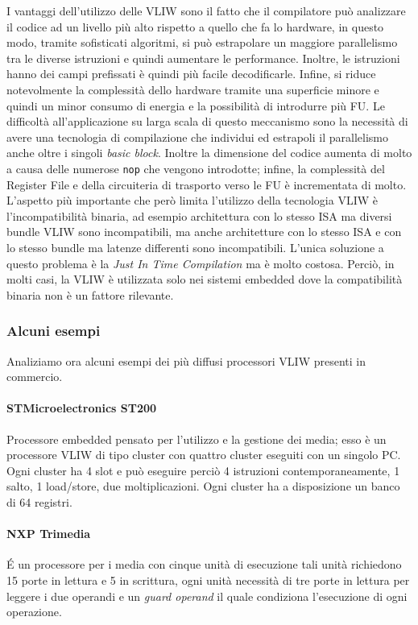 I vantaggi dell'utilizzo delle VLIW sono il fatto che il compilatore può analizzare il codice ad un livello più alto rispetto a quello che fa lo hardware, in questo modo, tramite sofisticati algoritmi, si può estrapolare un maggiore parallelismo tra le diverse istruzioni e quindi aumentare le performance. Inoltre, le istruzioni hanno dei campi prefissati è quindi più facile decodificarle. Infine, si riduce notevolmente la complessità dello hardware tramite una superficie minore e quindi un minor consumo di energia e la possibilità di introdurre più FU. Le difficoltà all'applicazione su larga scala di questo meccanismo sono la necessità di avere una tecnologia di compilazione che individui ed estrapoli il parallelismo anche oltre i singoli \emph{basic block}. Inoltre la dimensione del codice aumenta di molto a causa delle numerose \texttt{nop} che vengono introdotte; infine, la complessità del Register File e della circuiteria di trasporto verso le FU è incrementata di molto. L'aspetto più importante che però limita l'utilizzo della tecnologia VLIW è l'incompatibilità binaria, ad esempio architettura con lo stesso ISA ma diversi bundle VLIW sono incompatibili, ma anche architetture con lo stesso ISA e con lo stesso bundle ma latenze differenti sono incompatibili. L'unica soluzione a questo problema è la \emph{Just In Time Compilation} ma è molto costosa. Perciò, in molti casi, la VLIW è utilizzata solo nei sistemi embedded dove la compatibilità binaria non è un fattore rilevante.
\subsubsection{Alcuni esempi}
Analiziamo ora alcuni esempi dei più diffusi processori VLIW presenti in commercio.
\paragraph{STMicroelectronics ST200}
Processore embedded pensato per l'utilizzo e la gestione dei media; esso è un processore VLIW di tipo cluster con quattro cluster eseguiti con un singolo PC. Ogni cluster ha 4 slot e può eseguire perciò 4 istruzioni contemporaneamente, 1 salto, 1 load/store, due moltiplicazioni. Ogni cluster ha a disposizione un banco di 64 registri.
\paragraph{NXP Trimedia}
\uppercase{é} un processore per i media con cinque unità di esecuzione tali unità richiedono 15 porte in lettura e 5 in scrittura, ogni unità necessità di tre porte in lettura per leggere i due operandi e un \emph{guard operand} il quale condiziona l'esecuzione di ogni operazione.
